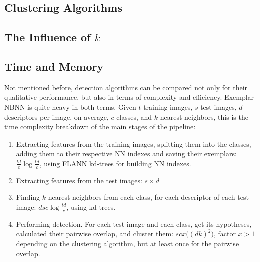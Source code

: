 

\subsection{Clustering Algorithms} %
\label{sub:anal_clustering_algorithms}




\subsection{The Influence of $k$} %
\label{sub:the_influence_of_k_}


\subsection{Time and Memory} %
\label{sub:time_and_memory_constraints}

Not mentioned before, detection algorithms can be compared not only for their qualitative performance, but also in terms of complexity and efficiency. Exemplar-NBNN is quite heavy in both terms. Given $t$ training images, $s$ test images, $d$ descriptors per image, on average, $c$ classes, and $k$ nearest neighbors, this is the time complexity breakdown of the main stages of the pipeline:
\begin{enumerate}
    \item Extracting features from the training images, splitting them into the classes, adding them to their respective NN indexes and saving their exemplars: $\frac{td}{c} \log \frac{td}{c}$, using FLANN kd-trees for building NN indexes.
    \item Extracting features from the test images: $s\times d$
    \item Finding $k$ nearest neighbors from each class, for each descriptor of each test image: $d s c \log \frac{td}{c} $, using kd-trees.
    \item Performing detection. For each test image and each class, get its hypotheses, calculated their pairwise overlap, and cluster them: $s c x\big((d k)^2\big)$, factor $x>1$ depending on the clustering algorithm, but at least once for the pairwise overlap.
\end{enumerate}




